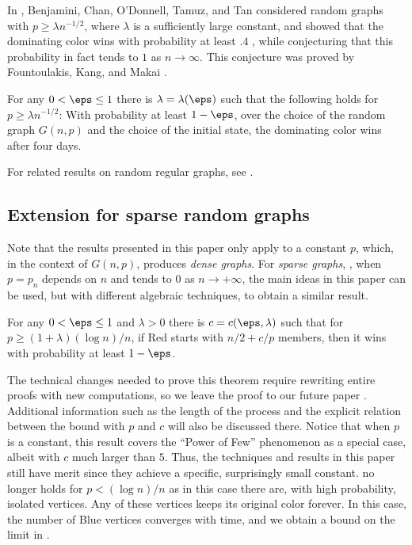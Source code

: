\documentclass{toc}
\begin{document}
			In \cite{benjamini}, Benjamini, Chan, O'Donnell, Tamuz, and Tan considered random graphs with $p \ge \lambda n^{-1/2} $, where $\lambda $ is a sufficiently large constant, and showed that the dominating color wins with probability at least $.4$ \cite[Theorem 1.2]{benjamini}, while conjecturing that this probability in fact tends to $1$ as $n \to \infty$. This conjecture was proved by Fountoulakis, Kang, and Makai
			\cite[Theorem 1.1]{fountoulakis}.
			
			\begin{theorem}  \label{FKM}
				For any $0< \eps \le 1$ there is $\lambda = \lambda(\eps)$ such that the following holds for $p \ge \lambda n^{-1/2} $:
				With probability at least $1 -\eps$, over the choice of the random graph $G(n,p)$
				and the choice of the initial state, the dominating color wins after four days.
			\end{theorem}
			
			For related results on random regular graphs, see \cite{mossel2014, mossel2017}.
			
			
			\subsection{Extension for sparse random graphs}
			
			Note that the results presented in this paper only %
			apply to  %
			a constant $p$, which, in the context of $G(n, p)$, produces \emph{dense graphs}. For \emph{sparse graphs}, \ie, when $p = p_n$ depends on $n$ and tends to $0$ as $n \to +\infty$, the main ideas in this paper can be used, but with different algebraic techniques, to obtain a similar result.
			
			\begin{theorem} \label{thm:general-sparse}
				For any $0< \eps \le 1$ and $\lambda > 0$ there is $c = c (\eps, \lambda)$ such that for $p \ge (1 + \lambda) (\log n)/n$,
				if Red starts with $n/2 + c/p$ members, then it wins with probability at least $1 -\eps$.
			\end{theorem}
			
			The technical changes needed to prove this theorem require rewriting entire proofs with new computations, so we leave the proof to our future paper \cite{TranVusparse}. Additional information such as the length of the process and the explicit relation between the bound with $p$ and $c$ will also be discussed there.
			Notice that when $p$ is a constant, this result covers the ``Power of Few'' phenomenon as a special case, albeit with $c$ much larger than $5$. Thus, the techniques and results in this paper still have merit since they achieve a specific, surprisingly small constant.
			 no longer holds for $p < (\log n)/n$ as in this case there are, with high probability, isolated vertices. Any of these vertices  keeps %
			its  %
			original color forever. In this case, the number of Blue vertices  converges with time, and we obtain a bound on the limit in \cite{TranVusparse}.
			
\end{document}
